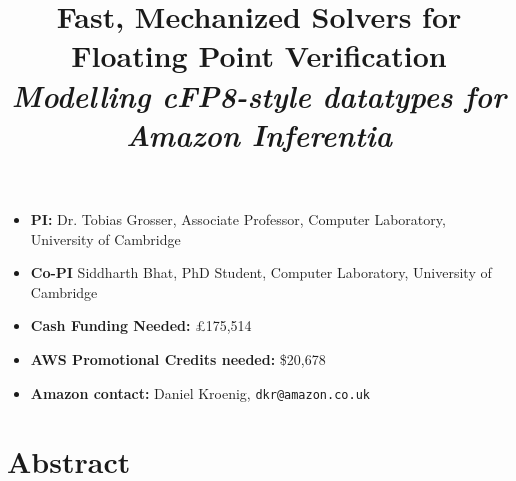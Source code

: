 \documentclass[onecolumn]{article}
\begin{document}
\newcommand{\fplean}{\texttt{fp.lean}}
\newcommand{\bvdecide}{\texttt{bv\_decide}}
\newcommand{\leanwuzla}{\texttt{leanwuzla}}
\newcommand{\qfbv}{\texttt{QF\_BV}}
\newcommand{\LIA}{\texttt{LIA}}
\newcommand{\Z}{\ensuremath{\mathbb Z}}
\newcommand{\euf}{\ensuremath{\texttt{EUF}}}

\newcommand{\lies}[1]{{\color{liescolor}#1}}



\title{\textbf{Fast, Mechanized Solvers for Floating Point Verification} \\
{\textit{Modelling cFP8-style datatypes for Amazon Inferentia}}
}
\date{\vspace{-5ex}}
\maketitle{}

{
\centering
\begin{itemize}
  \item \textbf{PI:} Dr. Tobias Grosser, Associate Professor, Computer Laboratory, University of Cambridge
  \item \textbf{Co-PI} Siddharth Bhat, PhD Student, Computer Laboratory, University of Cambridge
  \item \textbf{Cash Funding Needed:} £175,514
  \item \textbf{AWS Promotional Credits needed:} \$20,678
  \item \textbf{Amazon contact:} Daniel Kroenig, {\texttt{dkr@amazon.co.uk}}
\end{itemize}
}

\section*{Abstract}
\end{document}
